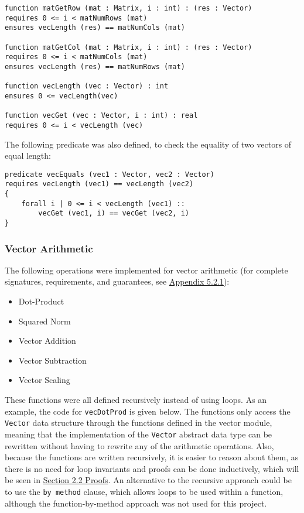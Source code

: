 \documentclass[12pt]{article}
\begin{document}
\begin{verbatim}
function matGetRow (mat : Matrix, i : int) : (res : Vector)
requires 0 <= i < matNumRows (mat)
ensures vecLength (res) == matNumCols (mat)

function matGetCol (mat : Matrix, i : int) : (res : Vector)
requires 0 <= i < matNumCols (mat)
ensures vecLength (res) == matNumRows (mat)

function vecLength (vec : Vector) : int
ensures 0 <= vecLength(vec)

function vecGet (vec : Vector, i : int) : real
requires 0 <= i < vecLength (vec)
\end{verbatim}

The following predicate was also defined, to check the equality of two vectors of equal length:

\begin{verbatim}
predicate vecEquals (vec1 : Vector, vec2 : Vector)
requires vecLength (vec1) == vecLength (vec2)
{
    forall i | 0 <= i < vecLength (vec1) ::
        vecGet (vec1, i) == vecGet (vec2, i)
}
\end{verbatim}

\subsubsection{Vector Arithmetic}
The following operations were implemented for vector arithmetic (for complete signatures, requirements, and guarantees, see \hyperref[sec:vectorsigs]{Appendix 5.2.1}):
\begin{itemize}
\item Dot-Product
\item Squared Norm
\item Vector Addition
\item Vector Subtraction
\item Vector Scaling
\end{itemize}

These functions were all defined recursively instead of using loops. As an example, the code for \verb|vecDotProd| is given below. The functions only access the \verb|Vector| data structure through the functions defined in the vector module, meaning that the implementation of the \verb|Vector| abstract data type can be rewritten without having to rewrite any of the arithmetic operations. Also, because the functions are written recursively, it is easier to reason about them, as there is no need for loop invariants and proofs can be done inductively, which will be seen in \hyperref[sec:proofs]{Section 2.2 Proofs}. An alternative to the recursive approach could be to use the \verb|by method| clause, which allows loops to be used within a function, although the function-by-method approach was not used for this project.
\end{document}
